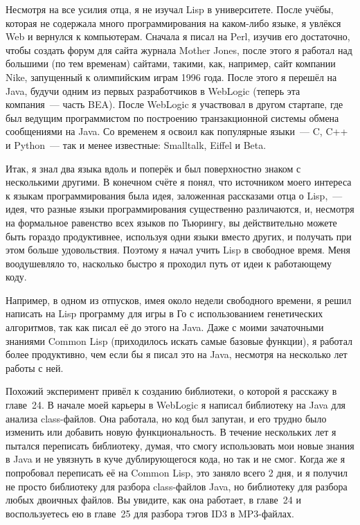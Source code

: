 Несмотря на все усилия отца, я не изучал Lisp в университете. После учёбы, которая
не содержала много программирования на каком-либо языке, я увлёкся Web и вернулся к
компьютерам. Сначала я писал на Perl, изучив его достаточно, чтобы создать форум для сайта
журнала Mother Jones, после этого я работал над большими (по тем временам) сайтами,
такими, как, например, сайт компании Nike, запущенный к олимпийским играм 1996 года. После
этого я перешёл на Java, будучи одним из первых разработчиков в WebLogic (теперь эта
компания~--- часть BEA). После WebLogic я участвовал в другом стартапе, где был ведущим
программистом по построению транзакционной системы обмена сообщениями на Java. Со временем
я освоил как популярные языки~--- C, C++ и Python~--- так и менее известные: Smalltalk, Eiffel и Beta.

Итак, я знал два языка вдоль и поперёк и был поверхностно знаком с несколькими другими.
В конечном счёте я понял, что источником моего интереса к языкам программирования
была идея, заложенная рассказами отца о Lisp,~--- идея, что разные языки
программирования существенно различаются, и, несмотря на формальное равенство всех языков
по Тьюрингу, вы действительно можете быть гораздо продуктивнее, используя
одни языки вместо других, и получать при этом больше удовольствия. Поэтому я начал учить
Lisp в свободное время. Меня воодушевляло то, насколько быстро я проходил путь от идеи к
работающему коду.

Например, в одном из отпусков, имея около недели свободного времени, я решил написать
на Lisp программу для игры в Го с использованием генетических алгоритмов, так как писал её
до этого на Java. Даже с моими зачаточными знаниями Common Lisp (приходилось искать
самые базовые функции), я работал более продуктивно, чем если бы я писал это на Java,
несмотря на несколько лет работы с ней.

Похожий эксперимент привёл к созданию библиотеки, о которой я расскажу в главе~24. В
начале моей карьеры в WebLogic я написал библиотеку на Java для анализа class-файлов.
Она работала, но код был запутан, и его трудно было изменить или добавить новую функциональность.
В течение нескольких лет я пытался переписать библиотеку,
думая, что смогу использовать мои новые знания в Java и не увязнуть в куче дублирующегося
кода, но так и не смог. Когда же я попробовал переписать её на Common Lisp, это заняло всего
2 дня, и я получил не просто библиотеку для разбора class-файлов Java, но библиотеку для
разбора любых двоичных файлов. Вы увидите, как она работает, в главе~24 и воспользуетесь
ею в главе~25 для разбора тэгов ID3 в MP3-файлах.

